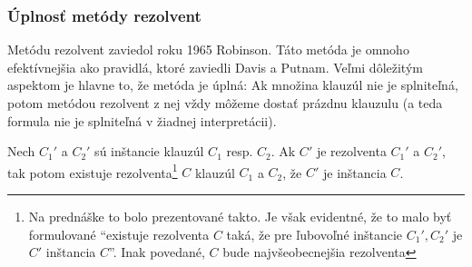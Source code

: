 \subsubsection{Úplnosť metódy rezolvent}
Metódu rezolvent zaviedol roku 1965 Robinson.
Táto metóda je omnoho efektívnejšia ako pravidlá, ktoré zaviedli
Davis a Putnam. Veľmi dôležitým aspektom je hlavne to, že metóda
je úplná:
Ak množina klauzúl nie je splniteľná, potom metódou rezolvent z nej vždy
môžeme dostať prázdnu klauzulu 
(a teda formula nie je splniteľná v žiadnej interpretácii). 

\begin{lema}
    Nech $C_1'$ a $C_2'$ sú inštancie klauzúl $C_1$ resp. $C_2$.
    Ak $C'$ je rezolventa $C_1'$ a $C_2'$,
    tak potom existuje rezolventa\footnote{Na prednáške to bolo
        prezentované takto. Je však evidentné, že to malo byť
        formulované ``existuje rezolventa $C$ taká, že pre ľubovoľné
        inštancie $C_1',C_2'$ je $C'$ inštancia $C$''. Inak povedané,
        $C$ bude najvšeobecnejšia rezolventa}    
    $C$ klauzúl $C_1$ a $C_2$, 
    že $C'$ je inštancia $C$. 
\end{lema}

